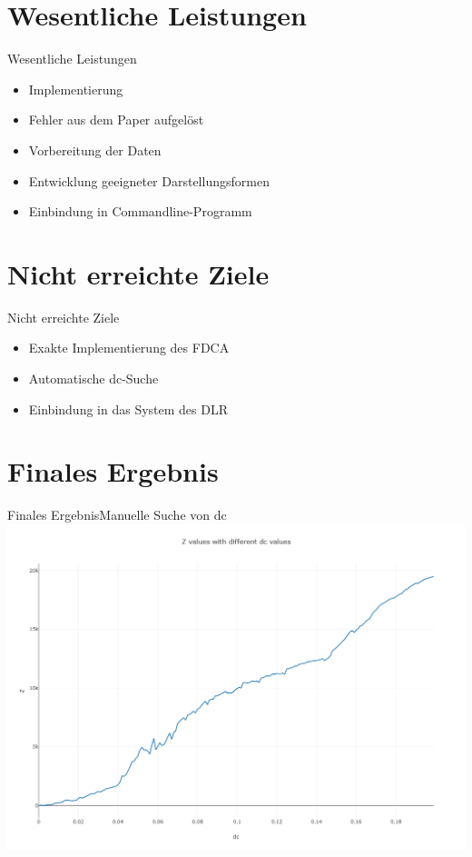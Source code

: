 \documentclass[12pt, xcolor={usenames,dvipsnames,svgnames,x11names,table}]{beamer}
\begin{document}
	
	\section{Wesentliche Leistungen}
	\begin{frame}{Wesentliche Leistungen}{}
		\begin{itemize}
			\item Implementierung %
			\item Fehler aus dem Paper aufgelöst %
			\item Vorbereitung der Daten
			\item Entwicklung geeigneter Darstellungsformen
			\item Einbindung in Commandline-Programm
		\end{itemize}		%
	\end{frame}
	

	\section{Nicht erreichte Ziele}
	\begin{frame}{Nicht erreichte Ziele}{}
		\begin{itemize}
			\item Exakte Implementierung des FDCA
			\item Automatische dc-Suche
			\item Einbindung in das System des DLR
		\end{itemize}
	\end{frame}
	
	
	\section{Finales Ergebnis}
	\begin{frame}{Finales Ergebnis}{Manuelle Suche von dc}
		\center\includegraphics[width=.9\textwidth]{twitter_z_dc_graph}
	\end{frame}
	
\end{document}

